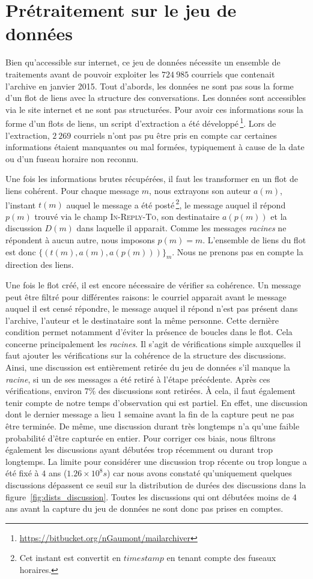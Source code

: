 \section{Prétraitement sur le jeu de données}
Bien qu'accessible sur internet, ce jeu de données nécessite un ensemble de traitements avant de pouvoir exploiter les $724\ 985$ courriels que contenait l'archive en janvier 2015.
Tout d'abords, les données ne sont pas sous la forme d'un flot de liens avec la structure des conversations.
Les données sont accessibles via le site internet et ne sont pas structurées.
Pour avoir ces informations sous la forme d'un flots de liens, un script d'extraction a été développé\,\footnote{\url{https://bitbucket.org/nGaumont/mailarchiver}}.
Lors de l'extraction, $2\ 269$ courriels n'ont pas pu être pris en compte car certaines informations étaient manquantes ou mal formées, typiquement à cause de la date ou d'un fuseau horaire non reconnu.

Une fois les informations brutes récupérées, il faut les transformer en un flot de liens cohérent.
Pour chaque message $m$, nous extrayons son auteur $a(m)$, l'instant $t(m)$ auquel le message a été posté\,\footnote{Cet instant est convertit en $timestamp$ en tenant compte des fuseaux horaires.}, le message auquel il répond $p(m)$ trouvé via le champ \textsc{In-Reply-To}, son destinataire $a(p(m))$ et la discussion $D(m)$ dans laquelle il apparait.
Comme les messages \emph{racines} ne répondent à aucun autre, nous imposons $p(m)=m$.
L'ensemble de liens du flot est donc $\{(t(m),a(m),a(p(m)))\}_m$.
Nous ne prenons pas en compte la direction des liens.

Une fois le flot créé, il est encore nécessaire de vérifier sa cohérence.
Un message peut être filtré pour différentes raisons: le courriel apparait avant le message auquel il est censé répondre, le message auquel il répond n'est pas présent dans l'archive, l'auteur et le destinataire sont la même personne.
Cette dernière condition permet notamment d'éviter la présence de boucles dans le flot.
Cela concerne principalement les \emph{racines}.
Il s'agit de vérifications simple auxquelles il faut ajouter les vérifications sur la cohérence de la structure des discussions.
Ainsi, une discussion est entièrement retirée du jeu de données s'il manque la \emph{racine}, si un de ses messages a été retiré à l'étape précédente.
Après ces vérifications, environ $7\%$ des discussions sont retirées.
\`A cela, il faut également tenir compte de notre temps d'observation qui est partiel.
En effet, une discussion dont le dernier message a lieu 1 semaine avant la fin de la capture peut ne pas être terminée.
De même, une discussion durant très longtemps n'a qu'une faible probabilité d'être capturée en entier.
Pour corriger ces biais, nous filtrons également les discussions ayant débutées trop récemment ou durant trop longtemps.
La limite pour considérer une discussion trop récente ou trop longue a été fixé à $4$ ans ($1.26\times 10^8 s$) car nous avons constaté qu'uniquement quelques discussions dépassent ce seuil sur la distribution de durées des discussions dans la figure~\ref{fig:dists_discussion}.
Toutes les discussions qui ont débutées moins de 4 ans avant la capture du jeu de données ne sont donc pas prises en comptes.


